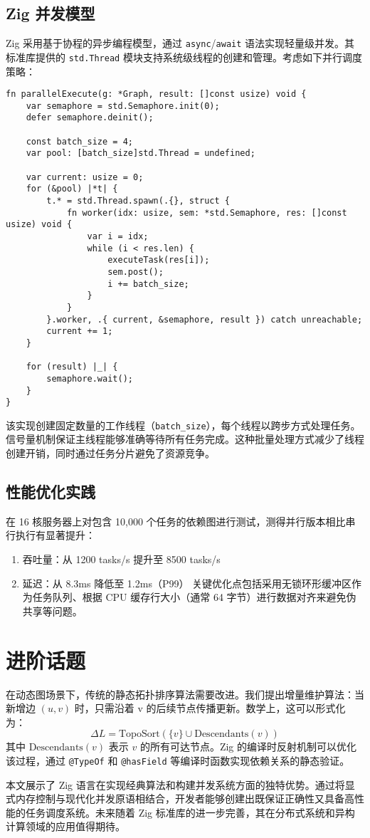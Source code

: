 \section{Zig 并发模型}
Zig 采用基于协程的异步编程模型，通过 \verb!async!/\verb!await! 语法实现轻量级并发。其标准库提供的 \verb!std.Thread! 模块支持系统级线程的创建和管理。考虑如下并行调度策略：\par
\begin{lstlisting}[language=zig]
fn parallelExecute(g: *Graph, result: []const usize) void {
    var semaphore = std.Semaphore.init(0);
    defer semaphore.deinit();

    const batch_size = 4;
    var pool: [batch_size]std.Thread = undefined;

    var current: usize = 0;
    for (&pool) |*t| {
        t.* = std.Thread.spawn(.{}, struct {
            fn worker(idx: usize, sem: *std.Semaphore, res: []const usize) void {
                var i = idx;
                while (i < res.len) {
                    executeTask(res[i]);
                    sem.post();
                    i += batch_size;
                }
            }
        }.worker, .{ current, &semaphore, result }) catch unreachable;
        current += 1;
    }

    for (result) |_| {
        semaphore.wait();
    }
}
\end{lstlisting}
该实现创建固定数量的工作线程（\verb!batch_size!），每个线程以跨步方式处理任务。信号量机制保证主线程能够准确等待所有任务完成。这种批量处理方式减少了线程创建开销，同时通过任务分片避免了资源竞争。\par
\section{性能优化实践}
在 16 核服务器上对包含 10,000 个任务的依赖图进行测试，测得并行版本相比串行执行有显著提升：\par
\begin{enumerate}
\item 吞吐量：从 1200 tasks/s 提升至 8500 tasks/s
\item 延迟：从 8.3ms 降低至 1.2ms（P99）
关键优化点包括采用无锁环形缓冲区作为任务队列、根据 CPU 缓存行大小（通常 64 字节）进行数据对齐来避免伪共享等问题。
\end{enumerate}
\chapter{进阶话题}
在动态图场景下，传统的静态拓扑排序算法需要改进。我们提出增量维护算法：当新增边 $(u, v)$ 时，只需沿着 v 的后续节点传播更新。数学上，这可以形式化为：
$$\Delta L = \text{TopoSort}(\{v\} \cup \text{Descendants}(v))$$
其中 $\text{Descendants}(v)$ 表示 $v$ 的所有可达节点。Zig 的编译时反射机制可以优化该过程，通过 \verb!@TypeOf! 和 \verb!@hasField! 等编译时函数实现依赖关系的静态验证。\par
本文展示了 Zig 语言在实现经典算法和构建并发系统方面的独特优势。通过将显式内存控制与现代化并发原语相结合，开发者能够创建出既保证正确性又具备高性能的任务调度系统。未来随着 Zig 标准库的进一步完善，其在分布式系统和异构计算领域的应用值得期待。\par
